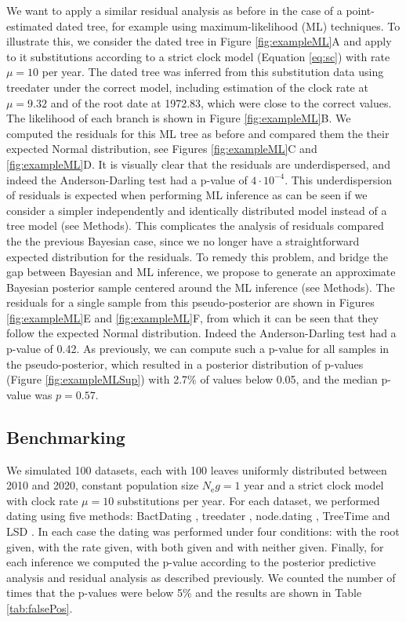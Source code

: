 \documentclass{article}
\begin{document}
We want to apply a similar residual analysis as before in the case of a point-estimated dated tree,
for example using maximum-likelihood (ML) techniques. To illustrate this, we consider the dated
tree in Figure \ref{fig:exampleML}A and apply to it substitutions according to a strict clock model
(Equation \ref{eq:sc}) with rate $\mu=10$ per year. The dated tree was inferred from this substitution data
using treedater \citep{Volz2017} under the correct model, including estimation of the clock rate at 
$\mu=9.32$ and of the root date at 1972.83, which were close to the correct values.
The likelihood of each branch is shown in Figure \ref{fig:exampleML}B.
We computed the residuals for this ML tree as before and compared them the their expected
Normal distribution, see Figures \ref{fig:exampleML}C and \ref{fig:exampleML}D.
It is visually clear that the residuals are underdispersed, and indeed the Anderson-Darling test 
had a p-value of $4\cdot10^{-4}$. This underdispersion of residuals is expected when performing 
ML inference as can be seen if we consider a simpler independently and identically 
distributed model instead of a tree model (see Methods). This complicates the analysis of residuals
compared the the previous Bayesian case, since we no longer have a straightforward expected 
distribution for the residuals. 
%
To remedy this problem, and bridge the gap between Bayesian and 
ML inference, we propose to generate an approximate Bayesian posterior sample centered
around the ML inference (see Methods). The residuals for a single sample from this pseudo-posterior
are shown in Figures \ref{fig:exampleML}E and \ref{fig:exampleML}F, from which it can be seen
that they follow the expected Normal distribution. Indeed the Anderson-Darling test had a p-value
of 0.42. As previously, we can compute such a p-value for all samples in the pseudo-posterior,
which resulted in a posterior distribution of p-values (Figure \ref{fig:exampleMLSup}) with 2.7\% of 
values below 0.05, and the median p-value was $p=0.57$.

\subsection*{Benchmarking}



We simulated 100 datasets, each with 100 leaves 
uniformly distributed between 2010 and 2020, 
constant population size $N_\mathrm{e}g=1$ year and 
a strict clock model with  clock rate $\mu=10$ substitutions per year.
For each dataset, we performed dating using five methods: 
BactDating \citep{Didelot2018}, treedater \citep{Volz2017},
node.dating \citep{Jones2017}, TreeTime \citep{Sagulenko2018} and LSD \citep{To2016}.
In each case the dating was performed under four conditions:
with the root given, with the rate given, with both given and with neither given.
Finally, for each inference we computed the p-value according to the posterior
predictive analysis and residual analysis as described previously. We counted the number
of times that the p-values were below 5\% and the results are shown in 
Table \ref{tab:falsePos}.
\end{document}

